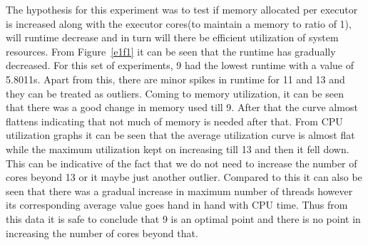 \documentclass[11pt]{article}
\begin{document}
The hypothesis for this experiment was to test if memory allocated per executor is increased along with the executor cores(to maintain a memory to ratio of 1), will runtime decrease and in turn will there be efficient utilization of system resources. From Figure~\ref{e1f1} it can be seen that the runtime has gradually decreased. For this set of experiments, 9 had the lowest runtime with a value of 5.8011s. Apart from this, there are minor spikes in runtime for 11 and 13 and they can be treated as outliers. Coming to memory utilization, it can be seen that there was a good change in memory used till 9. After that the curve almost flattens indicating that not much of memory is needed after that. From CPU utilization graphs it can be seen that the average utilization curve is almost flat while the maximum utilization kept on increasing till 13 and then it fell down. This can be indicative of the fact that we do not need to increase the number of cores beyond 13 or it maybe just another outlier. Compared to this it can also be seen that there was a gradual increase in maximum number of threads however its corresponding average value goes hand in hand with CPU time. Thus from this data it is safe to conclude that 9 is an optimal point and there is no point in increasing the number of cores beyond that. 
\end{document}
